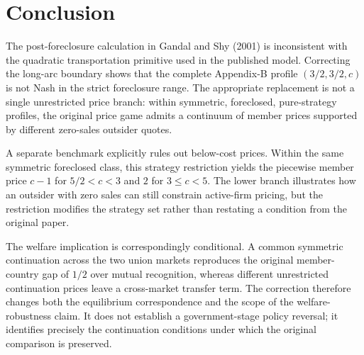 \section{Conclusion}\label{sec:conclusion}

The post-foreclosure calculation in Gandal and Shy (2001) is inconsistent with the quadratic transportation primitive used in the published model. Correcting the long-arc boundary shows that the complete Appendix-B profile $(3/2,3/2,c)$ is not Nash in the strict foreclosure range. The appropriate replacement is not a single unrestricted price branch: within symmetric, foreclosed, pure-strategy profiles, the original price game admits a continuum of member prices supported by different zero-sales outsider quotes.

A separate benchmark explicitly rules out below-cost prices. Within the same symmetric foreclosed class, this strategy restriction yields the piecewise member price $c-1$ for $5/2<c<3$ and $2$ for $3\leq c<5$. The lower branch illustrates how an outsider with zero sales can still constrain active-firm pricing, but the restriction modifies the strategy set rather than restating a condition from the original paper.

The welfare implication is correspondingly conditional. A common symmetric continuation across the two union markets reproduces the original member-country gap of $1/2$ over mutual recognition, whereas different unrestricted continuation prices leave a cross-market transfer term. The correction therefore changes both the equilibrium correspondence and the scope of the welfare-robustness claim. It does not establish a government-stage policy reversal; it identifies precisely the continuation conditions under which the original comparison is preserved.
